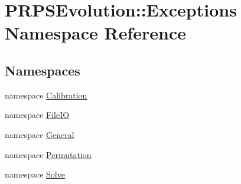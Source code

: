 \hypertarget{namespace_p_r_p_s_evolution_1_1_exceptions}{\section{\-P\-R\-P\-S\-Evolution\-:\-:\-Exceptions \-Namespace \-Reference}
\label{namespace_p_r_p_s_evolution_1_1_exceptions}
}
\subsection*{\-Namespaces}
\begin{DoxyCompactItemize}
\item 
namespace \hyperlink{namespace_p_r_p_s_evolution_1_1_exceptions_1_1_calibration}{\-Calibration}
\item 
namespace \hyperlink{namespace_p_r_p_s_evolution_1_1_exceptions_1_1_file_i_o}{\-File\-I\-O}
\item 
namespace \hyperlink{namespace_p_r_p_s_evolution_1_1_exceptions_1_1_general}{\-General}
\item 
namespace \hyperlink{namespace_p_r_p_s_evolution_1_1_exceptions_1_1_permutation}{\-Permutation}
\item 
namespace \hyperlink{namespace_p_r_p_s_evolution_1_1_exceptions_1_1_solve}{\-Solve}
\end{DoxyCompactItemize}
